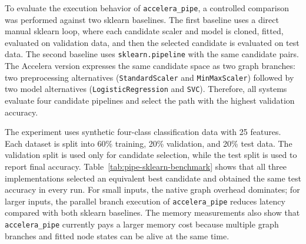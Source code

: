\documentclass[11pt,a4paper]{article}
\newcommand{\project}{Accelera}
\begin{document}
To evaluate the execution behavior of \texttt{accelera\_pipe}, a controlled
comparison was performed against two sklearn baselines. The first baseline
uses a direct manual sklearn loop, where each candidate scaler and model is
cloned, fitted, evaluated on validation data, and then the selected candidate
is evaluated on test data. The second baseline uses \texttt{sklearn.pipeline}
with the same candidate pairs. The \project{} version expresses the same
candidate space as two graph branches: two preprocessing alternatives
(\texttt{StandardScaler} and \texttt{MinMaxScaler}) followed by two model
alternatives (\texttt{LogisticRegression} and \texttt{SVC}). Therefore, all
systems evaluate four candidate pipelines and select the path with the highest
validation accuracy.

The experiment uses synthetic four-class classification data with 25 features.
Each dataset is split into 60\% training, 20\% validation, and 20\% test data.
The validation split is used only for candidate selection, while the test
split is used to report final accuracy. Table~\ref{tab:pipe-sklearn-benchmark}
shows that all three implementations selected an equivalent best candidate and
obtained the same test accuracy in every run. For small inputs, the native
graph overhead dominates; for larger inputs, the parallel branch execution of
\texttt{accelera\_pipe} reduces latency compared with both sklearn baselines.
The memory measurements also show that \texttt{accelera\_pipe} currently pays
a larger memory cost because multiple graph branches and fitted node states
can be alive at the same time.

\begin{table}[H]
\centering
\caption{Fair comparison between manual sklearn, sklearn Pipeline, and
\texttt{accelera\_pipe}. Time is measured in seconds and RSS is the process
resident-memory delta in MB.}
\label{tab:pipe-sklearn-benchmark}
\end{table}
\end{document}
